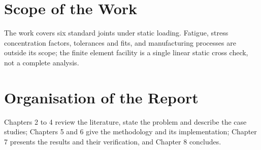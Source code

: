 \section{Scope of the Work}
The work covers six standard joints under static loading. Fatigue, stress concentration factors, tolerances and fits, and manufacturing processes are outside its scope; the finite element facility is a single linear static cross check, not a complete analysis.

\section{Organisation of the Report}
Chapters 2 to 4 review the literature, state the problem and describe the case studies; Chapters 5 and 6 give the methodology and its implementation; Chapter 7 presents the results and their verification, and Chapter 8 concludes.
